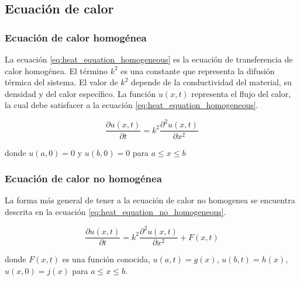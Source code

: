 \subsection{Ecuación de calor}

\subsubsection{Ecuación de calor homogénea}

La ecuación \ref{eq:heat_equation_homogeneous} es la ecuación de transferencia de calor homogénea. El término $k^2$ es una constante que representa la difusión térmica del sistema. El valor de $k^2$ depende de la conductividad del material, su densidad y del calor específico. La función $u(x,t)$ representa el flujo del calor, la cual debe satisfacer a la ecuación \ref{eq:heat_equation_homogeneous}.

\begin{equation}
    \frac{\partial u(x,t)}{\partial t} = k^2 \frac{\partial^2 u(x,t)}{\partial x^2} \label{eq:heat_equation_homogeneous}
\end{equation}

donde $u(a,0)=0$ y $u(b,0)=0$ para $a\leq x \leq b$

\subsubsection{Ecuación de calor no homogénea}


La forma más general de tener a la ecuación de calor no homogenea se encuentra descrita en la ecuación \ref{eq:heat_equation_no_homogeneous}.

\begin{equation}
    \frac{\partial u(x,t)}{\partial t} = k^2 \frac{\partial^2 u(x,t)}{\partial x^2}+F(x,t) \label{eq:heat_equation_no_homogeneous}
\end{equation}

donde $F(x,t)$ es una función conocida, $u(a,t)=g(x)$, $u(b,t)=h(x)$, $u(x,0)=j(x)$ para $a\leq x \leq b$\cite{trong_2005}.